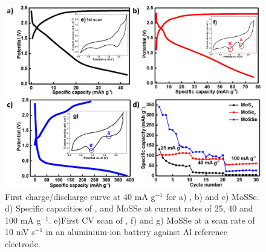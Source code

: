  \begin{figure}[htb!]
\centering
\includegraphics[width=\textwidth]{Figures/chap4fig/CDCCV}
\caption{First charge/discharge curve at 40 mA g$^{-1}$ for a) , b)  and c) MoSSe. d) Specific capacities of ,  and MoSSe at current rates of 25, 40 and 100 mA g$^{-1}$. e)First CV scan of , f)  and g) MoSSe at a scan rate of 10 mV s$^{-1}$ in an aluminium-ion battery against Al reference electrode.}
\label{Figures/chap4fig:CDCCV}
\end{figure} 

